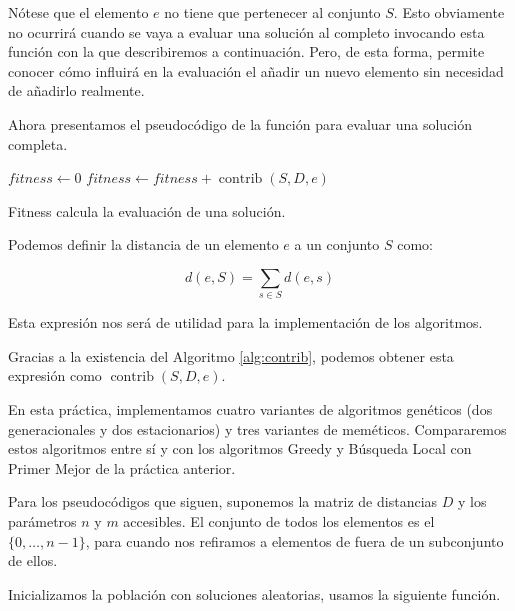 \documentclass{article}
\begin{document}
Nótese que el elemento $e$ no tiene que pertenecer al conjunto $S$. Esto obviamente no ocurrirá cuando se vaya a evaluar una solución
al completo invocando esta función con la que describiremos a continuación. Pero, de esta forma, permite conocer cómo influirá en la evaluación el añadir
 un nuevo elemento sin necesidad de añadirlo realmente. 
 
 Ahora presentamos el pseudocódigo de la función para evaluar una solución completa.
 
 \begin{algorithm}[H]
 	\DontPrintSemicolon %
 	$fitness \gets 0$\;
 	 {
 		$fitness \gets fitness + \operatorname{contrib}(S,D,e)$ 
 	}
 	 
 	\caption{{\sc Fitness} calcula la evaluación de una solución.}
 	\label{alg:eval}
 \end{algorithm}

Podemos definir la distancia de un elemento $e$ a un conjunto $S$ como:

\begin{equation} \label{eq:distance-elem-set}
	d(e,S)=\sum_{s\in S} d(e,s)
\end{equation}

Esta expresión nos será de utilidad para la implementación de los algoritmos.

Gracias a la existencia del Algoritmo \ref{alg:contrib}, podemos obtener esta expresión como $\operatorname{contrib}(S,D,e)$.

En esta práctica, implementamos cuatro variantes de algoritmos genéticos (dos generacionales y dos estacionarios) y tres variantes
de meméticos. Compararemos estos algoritmos entre sí y con los algoritmos Greedy y Búsqueda Local con Primer Mejor de la práctica anterior.

Para los pseudocódigos que siguen, suponemos la matriz de distancias $D$ y los parámetros $n$ y $m$ accesibles.
El conjunto de todos los elementos es el $\{0,\ldots,n-1\}$, para cuando nos refiramos a elementos de fuera de un subconjunto de ellos.

Inicializamos la población con soluciones aleatorias, usamos la siguiente función.
\end{document}
